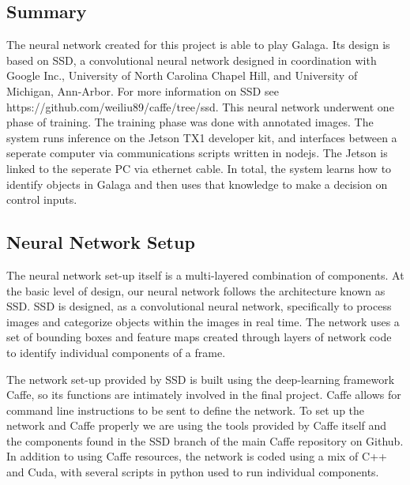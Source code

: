 \documentclass[onecolumn, draftclsnofoot,10pt, compsoc]{IEEEtran}
\begin{document}
\subsection{Summary}

The neural network created for this project is able to play Galaga.
Its design is based on SSD, a convolutional neural network designed in coordination with Google Inc.,  University of North Carolina Chapel Hill, and University of Michigan, Ann-Arbor.
For more information on SSD see https://github.com/weiliu89/caffe/tree/ssd.
This neural network underwent one phase of training.
The training phase was done with annotated images.
The system runs inference on the Jetson TX1 developer kit, and interfaces between a seperate computer via communications scripts written in nodejs.
The Jetson is linked to the seperate PC via ethernet cable.
In total, the system learns how to identify objects in Galaga and then uses that knowledge to make a decision on control inputs.

\subsection{Neural Network Setup}

The neural network set-up itself is a multi-layered combination of components.
At the basic level of design, our neural network follows the architecture known as SSD.
SSD is designed, as a convolutional neural network, specifically to process images and categorize objects within the images in real time.
The network uses a set of bounding boxes and feature maps created through layers of network code to identify individual components of a frame.

The network set-up provided by SSD is built using the deep-learning framework Caffe, so its functions are intimately involved in the final project.
Caffe allows for command line instructions to be sent to define the network.
To set up the network and Caffe properly we are using the tools provided by Caffe itself and the components found in the SSD branch of the main Caffe repository on Github.
In addition to using Caffe resources, the network is coded using a mix of C++ and Cuda, with several scripts in python used to run individual components.
\end{document}
